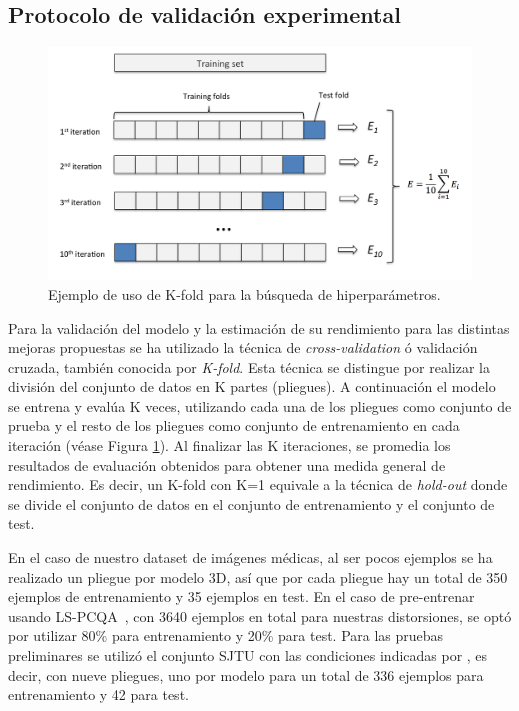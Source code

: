 \subsection{Protocolo de validación experimental} 
\label{sec:Validation}

\begin{figure}[htp]
 \begin{center}
   \includegraphics[width=\textwidth]{imagenes/chapter5/cross-validation}
 \end{center}
 \caption{Ejemplo de uso de K-fold para la búsqueda de hiperparámetros.}
 \label{fig:K-fold}
\end{figure}

Para la validación del modelo y la estimación de su rendimiento para las distintas 
mejoras propuestas se ha utilizado la técnica de \emph{cross-validation} ó 
validación cruzada, también conocida por \emph{K-fold}. 
Esta técnica se distingue por realizar la división del conjunto de datos 
en K partes (pliegues). A continuación el modelo se entrena y evalúa K veces, utilizando 
cada una de los pliegues como conjunto de prueba y el resto de los pliegues como 
conjunto de entrenamiento en cada iteración (véase Figura \ref{fig:K-fold}). 
Al finalizar las K iteraciones, se promedia los resultados de evaluación 
obtenidos para obtener una medida general de rendimiento. 
Es decir, un K-fold con K=1 equivale a la técnica de \emph{hold-out} 
donde se divide el conjunto de datos en el conjunto de entrenamiento y 
el conjunto de test.  

En el caso de nuestro dataset de imágenes médicas, al ser pocos ejemplos 
se ha realizado un pliegue por modelo 3D, así que por cada pliegue hay un total de 
350 ejemplos de entrenamiento y 35 ejemplos en test. 
En el caso de pre-entrenar usando LS-PCQA~\cite{ResSCNN}, con 3640 ejemplos en total para 
nuestras distorsiones, se optó por utilizar 80\% para entrenamiento y 20\% para test. 
Para las pruebas preliminares se utilizó el conjunto SJTU con las condiciones indicadas por 
\cite{VQA-PC}, es decir, con nueve pliegues, uno por modelo para un total de 336 ejemplos para entrenamiento y 42 para test. 

